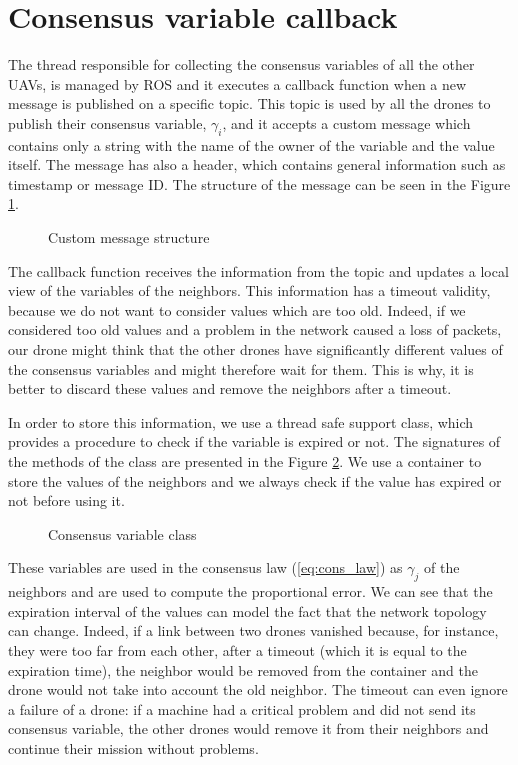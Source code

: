 \section{Consensus variable callback\label{sec:consensus_variable_callback}}

The thread responsible for collecting the consensus variables of all the other UAVs,
is managed by ROS and it executes a callback function when a new message is published
on a specific topic.
This topic is used by all the drones to publish their consensus variable, $\gamma_i$,
and it accepts a custom message which contains only a string with the name of the
owner of the variable and the value itself. The message has also a header, which contains
general information such as timestamp or message ID.
The structure of the message can be seen in the Figure \ref{fig:custom_message}.

\begin{figure}
\centering
  
\caption{Custom message structure}
\label{fig:custom_message}
\end{figure}

The callback function receives the information from the topic and updates a local
view of the variables of the neighbors. This information has a timeout validity,
because we do not want to consider values which are too old. Indeed, if we considered too old
values and a problem in the network caused a loss of packets, our drone might
think that the other drones have significantly different values of the consensus variables
and might therefore wait for them. This is why, it is better to discard these values and
remove the neighbors after a timeout.

In order to store this information, we use a thread safe support class, which
provides a procedure to check if the variable is expired or not.
The signatures of the methods of the class are presented in the Figure
\ref{fig:consensuss_variable_class}.
We use a container to store the values of the neighbors and we always check if the
value has expired or not before using it.

\begin{figure}
\centering
  
\caption{Consensus variable class}
\label{fig:consensuss_variable_class}
\end{figure}

These variables are used in the consensus law (\ref{eq:cons_law})
as $\gamma_j$ of the neighbors and are used to compute the proportional error.
We can see that the expiration interval of the values can model the
fact that the network topology can change.
Indeed, if a link between two drones vanished because, for instance, they were
too far from each other, after a timeout (which it is equal to the expiration time),
the neighbor would be removed from the container and the drone would not take into
account the old neighbor.
The timeout can even ignore a failure of a drone: if a machine had a critical
problem and did not send its consensus variable, the other drones would remove it from
their neighbors and continue their mission without problems.
